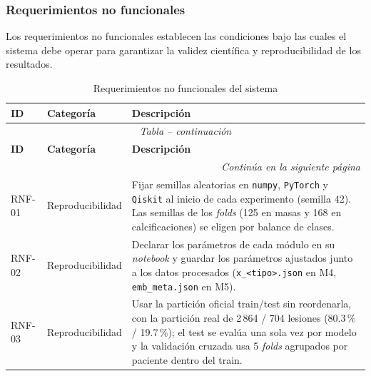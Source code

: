 \subsubsection{Requerimientos no funcionales}

Los requerimientos no funcionales establecen las condiciones
bajo las cuales el sistema debe operar para garantizar la
validez científica y reproducibilidad de los resultados.

\begingroup
\renewcommand{\arraystretch}{1.35}
\begin{longtable}{@{}llp{9.5cm}@{}}

\caption{Requerimientos no funcionales del sistema}
\label{tab:req_no_funcionales} \\

\toprule
\textbf{ID} & \textbf{Categoría} &
\textbf{Descripción} \\
\midrule
\endfirsthead

\multicolumn{3}{c}{%
  \small\textit{Tabla \thetable{} -- continuación}} \\[4pt]
\toprule
\textbf{ID} & \textbf{Categoría} &
\textbf{Descripción} \\
\midrule
\endhead

\midrule
\multicolumn{3}{r}{%
  \small\textit{Continúa en la siguiente página}} \\
\endfoot

\bottomrule
\endlastfoot

RNF-01 & Reproducibilidad &
Fijar semillas aleatorias en \texttt{numpy}, \texttt{PyTorch}
y \texttt{Qiskit} al inicio de cada experimento (semilla 42).
Las semillas de los \textit{folds} (125 en masas y 168 en
calcificaciones) se eligen por balance de clases. \\

RNF-02 & Reproducibilidad &
Declarar los parámetros de cada módulo en su \textit{notebook}
y guardar los parámetros ajustados junto a los datos procesados
(\texttt{x\_\textless tipo\textgreater.json} en M4, \texttt{emb\_meta.json} en M5). \\

RNF-03 & Reproducibilidad &
Usar la partición oficial train/test sin reordenarla, con la
partición real de 2\,864 / 704 lesiones (80.3\,\% / 19.7\,\%);
el test se evalúa una sola vez por modelo y la validación
cruzada usa 5 \textit{folds} agrupados por paciente dentro del
train. \\


\end{longtable}
